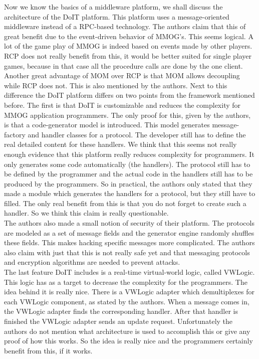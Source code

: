 \noindent Now we know the basics of a middleware platform, we shall discuss the architecture of the DoIT platform. This platform uses a message-oriented middleware instead of a RPC-based technology. The authors claim that this of great benefit due to the event-driven behavior of MMOG's. This seems logical. A lot of the game play of MMOG is indeed based on events made by other players. RCP does not really benefit from this, it would be better suited for single player games, because in that case all the procedure calls are done by the one client. \\
\indent Another great advantage of MOM over RCP is that MOM allows decoupling while RCP does not. This is also mentioned by the authors. Next to this difference the DoIT platform differs on two points from the framework mentioned before. The first is that DoIT is customizable and reduces the complexity for MMOG application programmers. The only proof for this, given by the authors, is that a code-generator model is introduced. This model generates message-factory and handler classes for a protocol. The developer still has to define the real detailed content for these handlers. We think that this seems not really enough evidence that this platform really reduces complexity for programmers. It only generates some code automatically (the handlers). The protocol still has to be defined by the programmer and the actual code in the handlers still has to be produced by the programmers. So in practical, the authors only stated that they made a module which generates the handlers for a protocol, but they still have to filled. The only real benefit from this is that you do not forget to create such a handler. So we think this claim is really questionable.\\
\indent The authors also made a small notion of security of their platform. The protocols are modeled as a set of message fields and the generator engine randomly shuffles these fields. This makes hacking specific messages more complicated. The authors also claim with just that this is not really safe yet and that messaging protocols and encryption algorithms are needed to prevent attacks.\\
\indent The last feature DoIT includes is a real-time virtual-world logic, called VWLogic. This logic has as a target to decrease the complexity for the programmers. The idea behind it is really nice. There is a VWLogic adapter which demultiplexes for each VWLogic component, as stated by the authors. When a message comes in, the VWLogic adapter finds the corresponding handler. After that handler is finished the VWLogic adapter sends an update request. Unfortunately the authors do not mention what architecture is used to accomplish this or give any proof of how this works. So the idea is really nice and the programmers certainly benefit from this, if it works.\\

